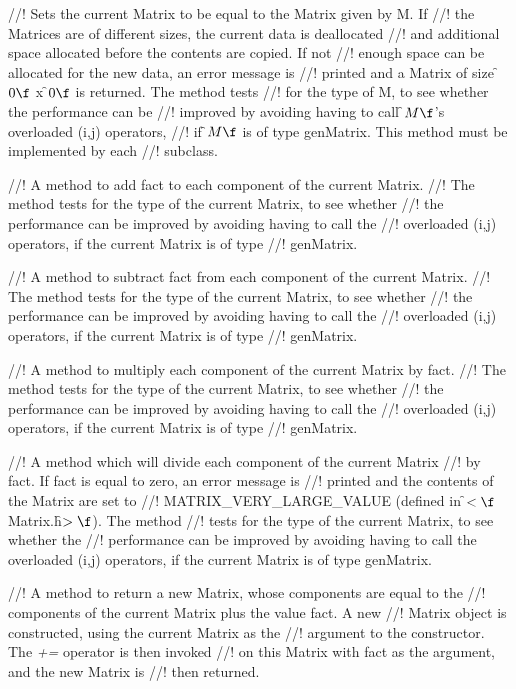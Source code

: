 //! Sets the current Matrix to be equal to the Matrix given by \p M. If
//! the Matrices are of different sizes, the current data is deallocated
//! and additional space allocated before the contents are copied. If not
//! enough space can be allocated for the new data, an error message is
//! printed and a Matrix of size \f$0\f$ x \f$0\f$ is returned. The method tests
//! for the type of \p M, to see whether the performance can be
//! improved by avoiding having to call \f$M\f$'s overloaded (i,j) operators,
//! if \f$M\f$ is of type genMatrix. This method must be implemented by each
//! subclass. 

//! A method to add \p fact to each component of the current Matrix. 
//! The method tests for the type of the current Matrix, to see whether
//! the performance can be improved by avoiding having to call the
//! overloaded (i,j) operators, if the current Matrix is of type
//! genMatrix. 

//! A method to subtract \p fact from each component of the current Matrix. 
//! The method tests for the type of the current Matrix, to see whether
//! the performance can be improved by avoiding having to call the
//! overloaded (i,j) operators, if the current Matrix is of type
//! genMatrix. 

//! A method to multiply each component of the current Matrix by \p fact. 
//! The method tests for the type of the current Matrix, to see whether
//! the performance can be improved by avoiding having to call the
//! overloaded (i,j) operators, if the current Matrix is of type
//! genMatrix. 

//! A method which will divide each component of the current Matrix
//! by \p fact. If \p fact is equal to zero, an error message is
//! printed and the contents of the Matrix are set to
//! MATRIX\_VERY\_LARGE\_VALUE (defined in \f$<\f$Matrix.h\f$>\f$). The method
//! tests for the type of the current Matrix, to see whether the
//! performance can be improved by avoiding having to call the overloaded
(i,j) operators, if the current Matrix is of type genMatrix. 

//! A method to return a new Matrix, whose components are equal to the
//! components of the current Matrix plus the value \p fact. A new
//! Matrix object is constructed, using the current Matrix as the
//! argument to the constructor. The {\em +=} operator is then invoked 
//! on this Matrix with \p fact as the argument, and the new Matrix is
//! then returned. 

